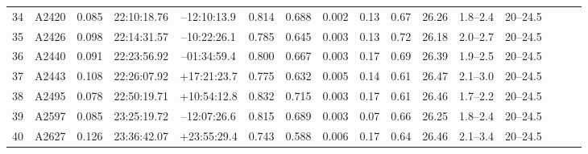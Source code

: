 \documentclass[useAMS,usenatbib]{mnras}
\begin{document}
\begin{table}
\begin{tabular*}{1.0\textwidth}{ l l c c c r c c c c c c c c l l }
34 & A2420 & 0.085 & 22:10:18.76 & \hspace{1.5pt}--\hspace{0.5pt}12:10:13.9 & 0.814 & 0.688 & 0.002 \hspace{8pt}& 0.13 & 0.67 & 26.26 \hspace{8pt}& 1.8--2.4 \hspace{8pt}& 20--24.5 \\
35 & A2426 & 0.098 & 22:14:31.57 & \hspace{1.5pt}--\hspace{0.5pt}10:22:26.1 & 0.785 & 0.645 & 0.003 \hspace{8pt}& 0.13 & 0.72 & 26.18 \hspace{8pt}& 2.0--2.7 \hspace{8pt}& 20--24.5 \\
36 & A2440 & 0.091 & 22:23:56.92 & \hspace{1.5pt}--\hspace{0.5pt}01:34:59.4 & 0.800 & 0.667 & 0.003 \hspace{8pt}& 0.17 & 0.69 & 26.39 \hspace{8pt}& 1.9--2.5 \hspace{8pt}& 20--24.5 \\
37 & A2443 & 0.108 & 22:26:07.92 & +17:21:23.7 & 0.775 & 0.632 & 0.005 \hspace{8pt}& 0.14 & 0.61 & 26.47 \hspace{8pt}& 2.1--3.0 \hspace{8pt}& 20--24.5 \\
38 & A2495 & 0.078 & 22:50:19.71 & +10:54:12.8 & 0.832 & 0.715 & 0.003 \hspace{8pt}& 0.17 & 0.61 & 26.46 \hspace{8pt}& 1.7--2.2 \hspace{8pt}& 20--24.5 \\
39 & A2597 & 0.085 & 23:25:19.72 & \hspace{1.5pt}--\hspace{0.5pt}12:07:26.6 & 0.815 & 0.689 & 0.003 \hspace{8pt}& 0.07 & 0.66 & 26.25 \hspace{8pt}& 1.8--2.4 \hspace{8pt}& 20--24.5 \\
40 & A2627 & 0.126 & 23:36:42.07 & +23:55:29.4 & 0.743 & 0.588 & 0.006 \hspace{8pt}& 0.17 & 0.64 & 26.46 \hspace{8pt}& 2.1--3.4 \hspace{8pt}& 20--24.5 \\

\end{tabular*}
\end{table}
\end{document}
